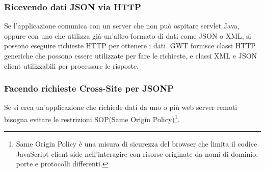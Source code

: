 \subsubsection*{Ricevendo dati JSON via HTTP}
Se l'applicazione comunica con un server che non pu\`o ospitare servlet Java, oppure con uno che utilizza gi\`a un'altro formato di dati come JSON o XML, si possono eseguire richieste HTTP per ottenere i dati. GWT fornisce classi HTTP generiche che possono essere utilizzate per fare le richieste, e classi XML e JSON client utilizzabili per processare le risposte.
\subsubsection*{Facendo richieste Cross-Site per JSONP}
Se si crea un'applicazione che richiede dati da uno o pi\`u web server remoti bisogna evitare le restrizioni SOP(Same Origin Policy)\footnote{Same Origin Policy \`e una misura di sicurezza del browser che limita il codice JavaScript client-side nell'interagire con risorse originate da nomi di dominio, porte e protocolli differenti.}.